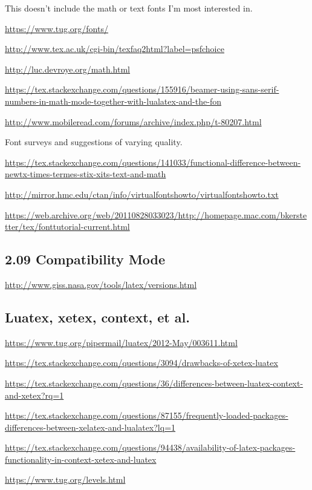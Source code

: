 \documentclass[12pt]{article}
\begin{document}
This doesn't include the math or text fonts I'm most interested in.

\url{https://www.tug.org/fonts/}

\url{http://www.tex.ac.uk/cgi-bin/texfaq2html?label=psfchoice}

\url{http://luc.devroye.org/math.html}

\url{https://tex.stackexchange.com/questions/155916/beamer-using-sans-serif-numbers-in-math-mode-together-with-lualatex-and-the-fon}

\url{http://www.mobileread.com/forums/archive/index.php/t-80207.html}

Font surveys and suggestions of varying quality.

\url{
https://tex.stackexchange.com/questions/141033/functional-difference-between-newtx-times-termes-stix-xits-text-and-math
}

\url{
http://mirror.hmc.edu/ctan/info/virtualfontshowto/virtualfontshowto.txt
}

\url{
https://web.archive.org/web/20110828033023/http://homepage.mac.com/bkerstetter/tex/fonttutorial-current.html
}



\subsection{2.09 Compatibility Mode}
\label{sec:compatibility_mode}

\url{
http://www.giss.nasa.gov/tools/latex/versions.html
}


\subsection{Luatex, xetex, context, et al.}

\url{
https://www.tug.org/pipermail/luatex/2012-May/003611.html
}

\url{
https://tex.stackexchange.com/questions/3094/drawbacks-of-xetex-luatex
}

\url{
https://tex.stackexchange.com/questions/36/differences-between-luatex-context-and-xetex?rq=1
}

\url{
https://tex.stackexchange.com/questions/87155/frequently-loaded-packages-differences-between-xelatex-and-lualatex?lq=1
}

\url{
https://tex.stackexchange.com/questions/94438/availability-of-latex-packages-functionality-in-context-xetex-and-luatex
}

\url{
https://www.tug.org/levels.html
}
\end{document}
